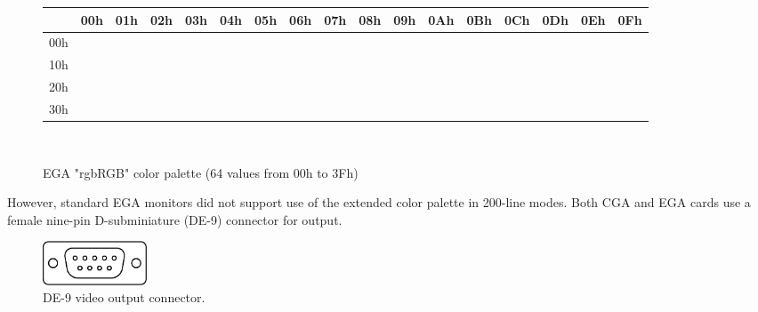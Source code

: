 \documentclass[book.tex]{subfiles}
\begin{document}
\begin{figure}[H]
\centering
\setlength{\tabcolsep}{2.8pt} %
\begin{tabular}{|c|c|c|c|c|c|c|c|c|c|c|c|c|c|c|c|c|}
\hline 
 & 00h & 01h & 02h & 03h & 04h & 05h & 06h & 07h & 08h & 09h & 0Ah & 0Bh & 0Ch & 0Dh & 0Eh & 0Fh \\ \hline
 00h & \cellcolor{CGA_Black} & \cellcolor{CGA_Blue} & \cellcolor{CGA_Green} & \cellcolor{CGA_Cyan} & \cellcolor{CGA_Red} & \cellcolor{CGA_Magenta} & \cellcolor{EGA_06} & \cellcolor{CGA_Light_Grey} & \cellcolor{EGA_08} & \cellcolor{EGA_09} & \cellcolor{EGA_0A} & \cellcolor{EGA_0B} & \cellcolor{EGA_0C} & \cellcolor{EGA_0D} & \cellcolor{EGA_0E} & \cellcolor{EGA_0F} \\ \hline

10h & \cellcolor{EGA_10} & \cellcolor{EGA_11} & \cellcolor{EGA_12} & \cellcolor{EGA_13} & \cellcolor{CGA_Brown} & \cellcolor{EGA_15} & \cellcolor{EGA_16} & \cellcolor{EGA_17} & \cellcolor{EGA_18} & \cellcolor{EGA_19} & \cellcolor{EGA_1A} & \cellcolor{EGA_1B} & \cellcolor{EGA_1C} & \cellcolor{EGA_1D} & \cellcolor{EGA_1E} & \cellcolor{EGA_1F} \\ \hline

20h & \cellcolor{EGA_20} & \cellcolor{EGA_21} & \cellcolor{EGA_22} & \cellcolor{EGA_23} & \cellcolor{EGA_24} & \cellcolor{EGA_25} & \cellcolor{EGA_26} & \cellcolor{EGA_27} & \cellcolor{EGA_28} & \cellcolor{EGA_29} & \cellcolor{EGA_2A} & \cellcolor{EGA_2B} & \cellcolor{EGA_2C} & \cellcolor{EGA_2D} & \cellcolor{EGA_2E} & \cellcolor{EGA_2F} \\ \hline

30h & \cellcolor{EGA_30} & \cellcolor{EGA_31} & \cellcolor{EGA_32} & \cellcolor{EGA_33} & \cellcolor{EGA_34} & \cellcolor{EGA_35} & \cellcolor{EGA_36} & \cellcolor{EGA_37} & \cellcolor{CGA_Dark_Grey} & \cellcolor{CGA_Bright_Blue} & \cellcolor{CGA_Bright_Green} & \cellcolor{CGA_Bright_Cyan} & \cellcolor{CGA_Bright_Red} & \cellcolor{CGA_Bright_Magenta} & \cellcolor{CGA_Bright_Brown} & \cellcolor{CGA_White} \\ \hline


\end{tabular}\\
\setlength{\tabcolsep}{6pt} %
\caption{EGA "rgbRGB" color palette (64 values from 00h to 3Fh)}
\end{figure}

\medskip
\par
However, standard EGA monitors did not support use of the extended color palette in 200-line modes. Both CGA and EGA cards use a female nine-pin D-subminiature (DE-9) connector for output. \\
 \begin{figure}[H]
\centering
\includegraphics[width=0.15\textwidth]{imgs/drawings/ports/DE9_serial_port.eps}
\caption{DE-9 video output connector.}
\label{fig:serialPort}
\end{figure}
\end{document}

